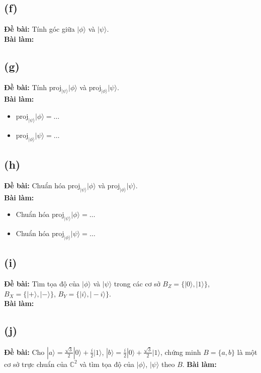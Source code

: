 \subsection{(f)}
\textbf{Đề bài:} Tính góc giữa $|\phi\rangle$ và $|\psi\rangle$.\\
\textbf{Bài làm:}

\subsection{(g)}
\textbf{Đề bài:} Tính $\mathrm{proj}_{|\psi\rangle}|\phi\rangle$ và $\mathrm{proj}_{|\phi\rangle}|\psi\rangle$.\\
\textbf{Bài làm:}
\begin{itemize}
    \item $\mathrm{proj}_{|\psi\rangle}|\phi\rangle = \dots$
    \item $\mathrm{proj}_{|\phi\rangle}|\psi\rangle = \dots$
\end{itemize}

\subsection{(h)}
\textbf{Đề bài:} Chuẩn hóa $\mathrm{proj}_{|\psi\rangle}|\phi\rangle$ và $\mathrm{proj}_{|\phi\rangle}|\psi\rangle$.\\
\textbf{Bài làm:}
\begin{itemize}
    \item Chuẩn hóa $\mathrm{proj}_{|\psi\rangle}|\phi\rangle = \dots$
    \item Chuẩn hóa $\mathrm{proj}_{|\phi\rangle}|\psi\rangle = \dots$
\end{itemize}

\subsection{(i)}
\textbf{Đề bài:} Tìm tọa độ của $|\phi\rangle$ và $|\psi\rangle$ trong các cơ sở $B_{Z}=\{|0\rangle,|1\rangle\}$, $B_{X}=\{|+\rangle,|-\rangle\}$, $B_{Y}=\{|i\rangle,|-i\rangle\}$.\\
\textbf{Bài làm:}

\subsection{(j)}
\textbf{Đề bài:} Cho $|a\rangle=\frac{\sqrt{3}}{2}|0\rangle+\frac{i}{2}|1\rangle$, $|b\rangle=\frac{i}{2}|0\rangle+\frac{\sqrt{3}}{2}|1\rangle$, chứng minh $B=\{a,b\}$ là một cơ sở trực chuẩn của $\mathbb{C}^{2}$ và tìm tọa độ của $|\phi\rangle$, $|\psi\rangle$ theo $B$.
\textbf{Bài làm:}

